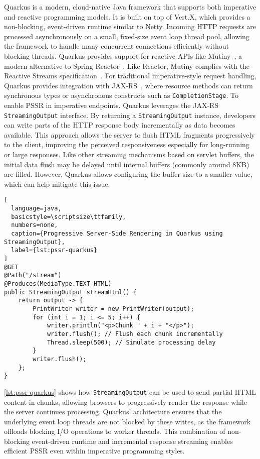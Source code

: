 Quarkus is a modern, cloud-native Java framework that supports both imperative
and reactive programming models. It is built on top of Vert.X, which provides a
non-blocking, event-driven runtime similar to Netty. Incoming HTTP requests are
processed asynchronously on a small, fixed-size event loop thread pool,
allowing the framework to handle many concurrent connections efficiently
without blocking threads. Quarkus provides support for reactive APIs like
Mutiny~\cite{mutiny2021}, a modern alternative to Spring
Reactor~\cite{projectreactor}. Like Reactor, Mutiny complies with the Reactive
Streams specification~\cite{ReactiveStreams}. For traditional imperative-style
request handling, Quarkus provides integration with
JAX-RS~\cite{burke2013restful}, where resource methods can return synchronous
types or asynchronous constructs such as \texttt{CompletionStage}. To enable
PSSR in imperative endpoints, Quarkus leverages the JAX-RS
\texttt{StreamingOutput} interface. By returning a \texttt{StreamingOutput}
instance, developers can write parts of the HTTP response body incrementally as
data becomes available. This approach allows the server to flush HTML fragments
progressively to the client, improving the perceived responsiveness especially
for long-running or large responses. Like other streaming mechanisms
based on servlet buffers, the initial data flush may be delayed until internal
buffers (commonly around 8KB) are filled. However, Quarkus allows configuring
the buffer size to a smaller value, which can help mitigate this issue.

\begin{lstlisting}[
  language=java,
  basicstyle=\scriptsize\ttfamily,
  numbers=none,
  caption={Progressive Server-Side Rendering in Quarkus using StreamingOutput},
  label={lst:pssr-quarkus}
]
@GET
@Path("/stream")
@Produces(MediaType.TEXT_HTML)
public StreamingOutput streamHtml() {
    return output -> {
        PrintWriter writer = new PrintWriter(output);
        for (int i = 1; i <= 5; i++) {
            writer.println("<p>Chunk " + i + "</p>");
            writer.flush(); // Flush each chunk incrementally
            Thread.sleep(500); // Simulate processing delay
        }
        writer.flush();
    };
}
\end{lstlisting}

\autoref{lst:pssr-quarkus} shows how \texttt{StreamingOutput} can be used to send
partial HTML content in chunks, allowing browsers to progressively render the
response while the server continues processing. Quarkus’ architecture ensures
that the underlying event loop threads are not blocked by these writes, as the
framework offloads blocking I/O operations to worker threads. This combination
of non-blocking event-driven runtime and incremental response streaming enables
efficient PSSR even within imperative programming styles.